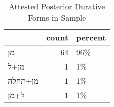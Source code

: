 \begin{table}[htbp!]
\centering
\caption{Attested Posterior Durative Forms in Sample}
\label{table:postdur_front}
\begin{tabular}{lrl}
\toprule
{} &  count & percent \\
\midrule
\texthebrew{מן}      &     64 &     96\% \\
\texthebrew{מן+ל}    &      1 &      1\% \\
\texthebrew{מן+תחלה} &      1 &      1\% \\
\texthebrew{ל+מן}    &      1 &      1\% \\
\bottomrule
\end{tabular}
\end{table}
